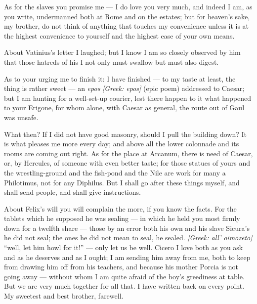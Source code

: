  As for the slaves you promise me --- I do love you very much, and indeed I am, as you write, undermanned both at Rome and on the estates; but for heaven's sake, my brother, do not think of anything that touches my convenience unless it is at the highest convenience to yourself and the highest ease of your own means.

 About Vatinius's letter I laughed; but I know I am so closely observed by him that those hatreds of his I not only must swallow but must also digest.

 As to your urging me to finish it: I have finished --- to my taste at least, the thing is rather sweet --- an \textit{epos} \textit{[Greek: epos]} (epic poem) addressed to Caesar; but I am hunting for a well-set-up courier, lest there happen to it what happened to your Erigone, for whom alone, with Caesar as general, the route out of Gaul was unsafe.

 What then? If I did not have good masonry, should I pull the building down? It is what pleases me more every day; and above all the lower colonnade and its rooms are coming out right. As for the place at Arcanum, there is need of Caesar, or, by Hercules, of someone with even better taste; for those statues of yours and the wrestling-ground and the fish-pond and the Nile are work for many a Philotimus, not for any Diphilus. But I shall go after these things myself, and shall send people, and shall give instructions.

 About Felix's will you will complain the more, if you know the facts. For the tablets which he supposed he was sealing --- in which he held you most firmly down for a twelfth share --- those by an error both his own and his slave Sicura's he did not seal; the ones he did not mean to seal, he sealed. \textit{[Greek: all' oim\=oz\=et\=o]} ``well, let him howl for it!'' --- only let us be well. Cicero I love both as you ask and as he deserves and as I ought; I am sending him away from me, both to keep from drawing him off from his teachers, and because his mother Porcia is not going away --- without whom I am quite afraid of the boy's greediness at table. But we are very much together for all that. I have written back on every point. My sweetest and best brother, farewell.
